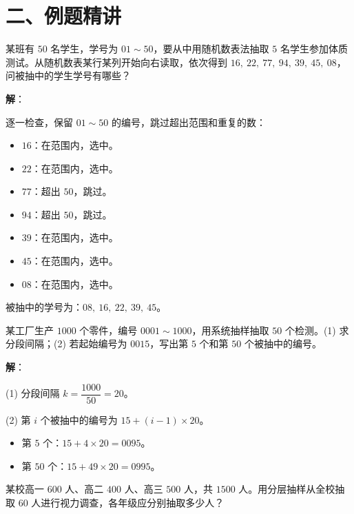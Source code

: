 \documentclass[12pt, a4paper]{ctexart}
\begin{document}
\section*{\textcolor{examorange}{二、例题精讲}}

\begin{examplebox}[【例1】简单随机抽样]
某班有 $50$ 名学生，学号为 $01 \sim 50$，要从中用随机数表法抽取 $5$ 名学生参加体质测试。从随机数表某行某列开始向右读取，依次得到 $16,\ 22,\ 77,\ 94,\ 39,\ 45,\ 08$，问被抽中的学生学号有哪些？
\end{examplebox}

\textbf{解}：

逐一检查，保留 $01 \sim 50$ 的编号，跳过超出范围和重复的数：
\begin{itemize}
  \item $16$：在范围内，选中。
  \item $22$：在范围内，选中。
  \item $77$：超出 $50$，跳过。
  \item $94$：超出 $50$，跳过。
  \item $39$：在范围内，选中。
  \item $45$：在范围内，选中。
  \item $08$：在范围内，选中。
\end{itemize}

被抽中的学号为：$08,\ 16,\ 22,\ 39,\ 45$。

\begin{examplebox}[【例2】系统抽样]
某工厂生产 $1000$ 个零件，编号 $0001 \sim 1000$，用系统抽样抽取 $50$ 个检测。(1) 求分段间隔；(2) 若起始编号为 $0015$，写出第 $5$ 个和第 $50$ 个被抽中的编号。
\end{examplebox}

\textbf{解}：

(1) 分段间隔 $k = \dfrac{1000}{50} = 20$。

(2) 第 $i$ 个被抽中的编号为 $15 + (i-1) \times 20$。
\begin{itemize}
  \item 第 $5$ 个：$15 + 4 \times 20 = 0095$。
  \item 第 $50$ 个：$15 + 49 \times 20 = 0995$。
\end{itemize}

\begin{examplebox}[【例3】分层抽样]
某校高一 $600$ 人、高二 $400$ 人、高三 $500$ 人，共 $1500$ 人。用分层抽样从全校抽取 $60$ 人进行视力调查，各年级应分别抽取多少人？
\end{examplebox}
\end{document}
